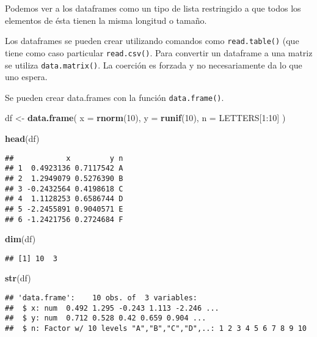 \documentclass[]{article}
\newenvironment{Shaded}{\begin{snugshade}}{\end{snugshade}}
\newcommand{\KeywordTok}[1]{\textcolor[rgb]{0.13,0.29,0.53}{\textbf{{#1}}}}
\newcommand{\DataTypeTok}[1]{\textcolor[rgb]{0.13,0.29,0.53}{{#1}}}
\newcommand{\DecValTok}[1]{\textcolor[rgb]{0.00,0.00,0.81}{{#1}}}
\newcommand{\StringTok}[1]{\textcolor[rgb]{0.31,0.60,0.02}{{#1}}}
\newcommand{\NormalTok}[1]{{#1}}
\begin{document}
Podemos ver a los dataframes como un tipo de lista restringido a que
todos los elementos de ésta tienen la misma longitud o tamaño.

Los dataframes se pueden crear utilizando comandos como
\texttt{read.table()} (que tiene como caso particular
\texttt{read.csv()}. Para convertir un dataframe a una matriz se utiliza
\texttt{data.matrix()}. La coerción es forzada y no necesariamente da lo
que uno espera.

Se pueden crear data.frames con la función \texttt{data.frame()}.

\begin{Shaded}
\begin{Highlighting}[]
\NormalTok{df <-}\StringTok{ }\KeywordTok{data.frame}\NormalTok{(}
  \DataTypeTok{x =} \KeywordTok{rnorm}\NormalTok{(}\DecValTok{10}\NormalTok{),}
  \DataTypeTok{y =} \KeywordTok{runif}\NormalTok{(}\DecValTok{10}\NormalTok{),}
  \DataTypeTok{n =} \NormalTok{LETTERS[}\DecValTok{1}\NormalTok{:}\DecValTok{10}\NormalTok{]}
\NormalTok{)}

\KeywordTok{head}\NormalTok{(df)}
\end{Highlighting}
\end{Shaded}

\begin{verbatim}
##            x         y n
## 1  0.4923136 0.7117542 A
## 2  1.2949079 0.5276390 B
## 3 -0.2432564 0.4198618 C
## 4  1.1128253 0.6586744 D
## 5 -2.2455891 0.9040571 E
## 6 -1.2421756 0.2724684 F
\end{verbatim}

\begin{Shaded}
\begin{Highlighting}[]
\KeywordTok{dim}\NormalTok{(df)}
\end{Highlighting}
\end{Shaded}

\begin{verbatim}
## [1] 10  3
\end{verbatim}

\begin{Shaded}
\begin{Highlighting}[]
\KeywordTok{str}\NormalTok{(df)}
\end{Highlighting}
\end{Shaded}

\begin{verbatim}
## 'data.frame':    10 obs. of  3 variables:
##  $ x: num  0.492 1.295 -0.243 1.113 -2.246 ...
##  $ y: num  0.712 0.528 0.42 0.659 0.904 ...
##  $ n: Factor w/ 10 levels "A","B","C","D",..: 1 2 3 4 5 6 7 8 9 10
\end{verbatim}
\end{document}
